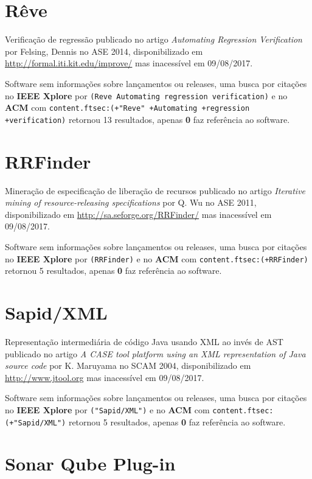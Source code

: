 \section{Rêve}

Verificação de regressão
publicado no artigo {\it Automating Regression Verification}
por Felsing, Dennis
no ASE 2014,
disponibilizado em \url{http://formal.iti.kit.edu/improve/}
mas inacessível em 09/08/2017.

Software sem informações sobre lançamentos ou releases,
uma busca por citações no {\bf IEEE Xplore} por
\texttt{(Reve Automating regression verification)}
e no {\bf ACM} com
\texttt{content.ftsec:(+"Reve" +Automating +regression +verification)}
retornou
13 resultados, apenas
{\bf 0} faz referência ao software.



\section{RRFinder}

Mineração de especificação de liberação de recursos
publicado no artigo {\it Iterative mining of resource-releasing specifications}
por Q. Wu
no ASE 2011,
disponibilizado em \url{http://sa.seforge.org/RRFinder/}
mas inacessível em 09/08/2017.

Software sem informações sobre lançamentos ou releases,
uma busca por citações no {\bf IEEE Xplore} por
\texttt{(RRFinder)}
e no {\bf ACM} com
\texttt{content.ftsec:(+RRFinder)}
retornou
5 resultados, apenas
{\bf 0} faz referência ao software.



\section{Sapid/XML}

Representação intermediária de código Java usando XML ao invés de AST
publicado no artigo {\it A CASE tool platform using an XML representation of Java source code}
por K. Maruyama
no SCAM 2004,
disponibilizado em \url{http://www.jtool.org}
mas inacessível em 09/08/2017.

Software sem informações sobre lançamentos ou releases,
uma busca por citações no {\bf IEEE Xplore} por
\texttt{("Sapid/XML")}
e no {\bf ACM} com
\texttt{content.ftsec:(+"Sapid/XML")}
retornou
5 resultados, apenas
{\bf 0} faz referência ao software.



\section{Sonar Qube Plug-in}

